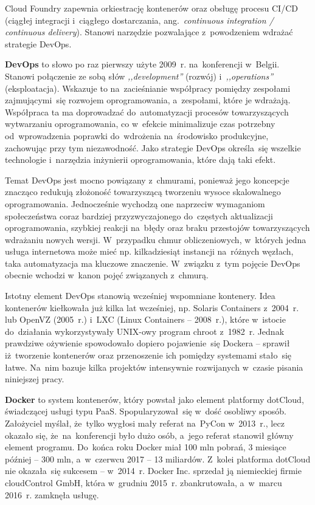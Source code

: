 \documentclass[12pt,a4paper,twoside,titlepage,openright]{book}
\begin{document}
Cloud Foundry zapewnia orkiestrację kontenerów oraz obsługę procesu CI/CD (ciągłej integracji i~ciągłego dostarczania, ang.~\textit{continuous integration / continuous delivery}).\cite{cloudFoundry} Stanowi narzędzie pozwalające z~powodzeniem wdrażać strategie DevOps. 

\textbf{DevOps} to słowo po raz pierwszy użyte 2009~r. na~konferencji w~Belgii. Stanowi połączenie ze sobą słów \textit{,,development''} (rozwój) i~\textit{,,operations''} (eksploatacja). Wskazuje to na~zacieśnianie współpracy pomiędzy zespołami zajmującymi~się rozwojem oprogramowania, a~zespołami, które je wdrażają. Współpraca ta ma doprowadzać do~automatyzacji procesów towarzyszących wytwarzaniu oprogramowania, co w~efekcie minimalizuje czas potrzebny od~wprowadzenia poprawki do~wdrożenia na~środowisko produkcyjne, zachowując przy tym niezawodność. Jako strategie DevOps określa~się wszelkie technologie i~narzędzia inżynierii oprogramowania, które dają taki efekt. \cite{devOpsPackt}

Temat DevOps jest mocno powiązany z~chmurami, ponieważ jego koncepcje znacząco redukują złożoność towarzyszącą tworzeniu wysoce skalowalnego oprogramowania. Jednocześnie wychodzą one naprzeciw wymaganiom społeczeństwa coraz bardziej przyzwyczajonego do~częstych aktualizacji oprogramowania, szybkiej reakcji na~błędy oraz braku przestojów towarzyszących wdrażaniu nowych wersji. W~przypadku chmur obliczeniowych, w~których jedna usługa internetowa może mieć np. kilkadziesiąt instancji na~różnych węzłach, taka automatyzacja ma kluczowe znaczenie. W~związku z~tym pojęcie DevOps obecnie wchodzi w~kanon pojęć związanych z~chmurą.

Istotny element DevOps stanowią wcześniej wspomniane kontenery. Idea kontenerów kiełkowała już kilka lat wcześniej, np. Solaris Containers z~2004~r. lub OpenVZ (2005~r.) i~LXC (Linux Containers -- 2008~r.), które w~istocie do~działania wykorzystywały UNIX-owy program chroot z~1982~r.\cite{siteOperatingSystemVirtualizationWiki} Jednak prawdziwe ożywienie spowodowało dopiero pojawienie~się Dockera -- sprawił iż~tworzenie kontenerów oraz przenoszenie ich pomiędzy systemami stało~się łatwe. Na~nim bazuje kilka projektów intensywnie rozwijanych w~czasie pisania niniejszej pracy.

\textbf{Docker} to system kontenerów, który powstał jako element platformy dotCloud, świadczącej usługi typu PaaS. Spopularyzował~się w~dość osobliwy sposób. Założyciel myślał, że~tylko wygłosi mały referat na~PyCon w~2013~r., lecz okazało się, że~na~konferencji było dużo osób, a~jego referat stanowił główny element programu. Do~końca roku Docker miał 100 mln pobrań, 3 miesiące później -- 300 mln, a~w~czerwcu 2017 -- 13 miliardów.\cite{siteDockerHistory} Z~kolei platforma dotCloud nie okazała~się sukcesem -- w~2014~r. Docker Inc. sprzedał ją niemieckiej firmie cloudControl GmbH, która w~grudniu 2015~r. zbankrutowała, a~w~marcu 2016~r. zamknęła usługę.\cite{siteCloudControlWiki}
\end{document}
